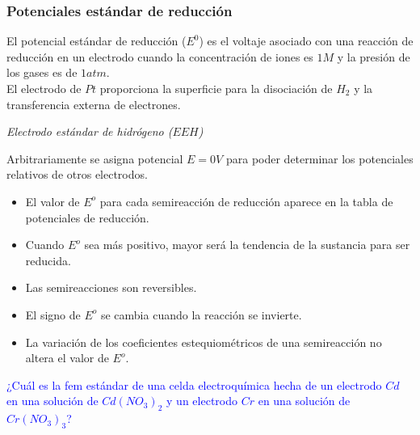         \subsubsection{Potenciales estándar de reducción}
        \sangria{} El potencial estándar de reducción ($E^0$) es el voltaje asociado con una reacción de reducción en un electrodo cuando la concentración de iones es $1M$ y la presión de los gases es de $1atm$. \\
        \sangria{} El electrodo de $Pt$ proporciona la superficie para la disociación de $H_2$ y la transferencia externa de electrones.
        \begin{center} \textit{Electrodo estándar de hidrógeno ($EEH$)} \end{center}
        \sangria{} Arbitrariamente se asigna potencial $E = 0V$ para poder determinar los potenciales relativos de otros electrodos.
        \begin{itemize}
            \item El valor de $E^o$ para cada semireacción de reducción aparece en la tabla de potenciales de reducción.
            \item Cuando $E^o$ sea más positivo, mayor será la tendencia de la sustancia para ser reducida.
            \item Las semireacciones son reversibles.
            \item El signo de $E^o$ se cambia cuando la reacción se invierte.
            \item La variación de los coeficientes estequiométricos de una semireacción no altera el valor de $E^o$.
        \end{itemize}
        \sangria{}\textcolor{blue}{¿Cuál es la fem estándar de una celda electroquímica hecha de un electrodo $Cd$ en una solución de $Cd(NO_3)_2$ y un electrodo $Cr$ en una solución de $Cr(NO_3)_3$?}
        \saltoPag{}
